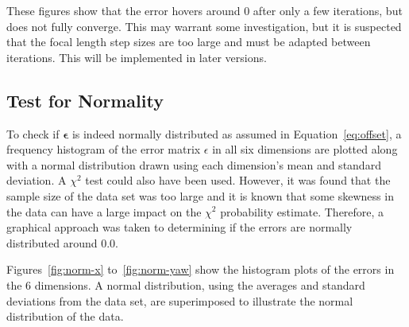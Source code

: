 These figures show that the error hovers around 0 after only a few iterations, but does not fully converge. This may warrant some investigation, but it is suspected that the focal length step sizes are too large and must be adapted between iterations. This will be implemented in later versions.

\subsection{Test for Normality}
\label{sec:err-norm-test}

To check if $\bm{\epsilon}$ is indeed normally distributed as assumed in Equation~\ref{eq:offset}, a frequency histogram of the error matrix $\epsilon$ in all six dimensions are plotted along with a normal distribution drawn using each dimension's mean and standard deviation. A $\chi^2$ test could also have been used. However, it was found that the sample size of the data set was too large and it is known that some skewness in the data can have a large impact on the $\chi^2$ probability estimate. Therefore, a graphical approach was taken to determining if the errors are normally distributed around 0.0. 

Figures~\ref{fig:norm-x} to~\ref{fig:norm-yaw} show the histogram plots of the errors in the 6 dimensions. A normal distribution, using the averages and standard deviations from the data set, are superimposed to illustrate the normal distribution of the data.

